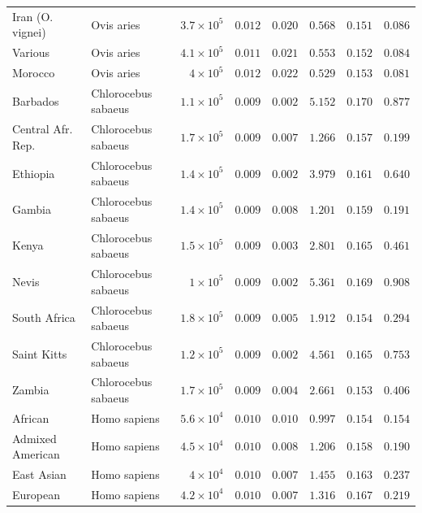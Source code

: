 \documentclass{article}
\begin{document}
\begin{center}
\begin{longtable*}{|l|l|r|r|r|r|r|r|}
            Iran (O. vignei) & Ovis aries & $3.7\times 10^{5}$ & $ 0.012$ & $ 0.020$ & $ 0.568$ & $ 0.151$ & $ 0.086$ \\
            Various & Ovis aries & $4.1\times 10^{5}$ & $ 0.011$ & $ 0.021$ & $ 0.553$ & $ 0.152$ & $ 0.084$ \\
            Morocco & Ovis aries & $ 4\times 10^{5}$ & $ 0.012$ & $ 0.022$ & $ 0.529$ & $ 0.153$ & $ 0.081$ \\
             Barbados & Chlorocebus sabaeus & $1.1\times 10^{5}$ & $ 0.009$ & $ 0.002$ & $ 5.152$ & $ 0.170$ & $ 0.877$ \\
             Central Afr. Rep. & Chlorocebus sabaeus & $1.7\times 10^{5}$ & $ 0.009$ & $ 0.007$ & $ 1.266$ & $ 0.157$ & $ 0.199$ \\
             Ethiopia & Chlorocebus sabaeus & $1.4\times 10^{5}$ & $ 0.009$ & $ 0.002$ & $ 3.979$ & $ 0.161$ & $ 0.640$ \\
             Gambia & Chlorocebus sabaeus & $1.4\times 10^{5}$ & $ 0.009$ & $ 0.008$ & $ 1.201$ & $ 0.159$ & $ 0.191$ \\
             Kenya & Chlorocebus sabaeus & $1.5\times 10^{5}$ & $ 0.009$ & $ 0.003$ & $ 2.801$ & $ 0.165$ & $ 0.461$ \\
             Nevis & Chlorocebus sabaeus & $ 1\times 10^{5}$ & $ 0.009$ & $ 0.002$ & $ 5.361$ & $ 0.169$ & $ 0.908$ \\
             South Africa & Chlorocebus sabaeus & $1.8\times 10^{5}$ & $ 0.009$ & $ 0.005$ & $ 1.912$ & $ 0.154$ & $ 0.294$ \\
             Saint Kitts & Chlorocebus sabaeus & $1.2\times 10^{5}$ & $ 0.009$ & $ 0.002$ & $ 4.561$ & $ 0.165$ & $ 0.753$ \\
             Zambia & Chlorocebus sabaeus & $1.7\times 10^{5}$ & $ 0.009$ & $ 0.004$ & $ 2.661$ & $ 0.153$ & $ 0.406$ \\
            African & Homo sapiens & $5.6\times 10^{4}$ & $ 0.010$ & $ 0.010$ & $ 0.997$ & $ 0.154$ & $ 0.154$ \\
            Admixed American & Homo sapiens & $4.5\times 10^{4}$ & $ 0.010$ & $ 0.008$ & $ 1.206$ & $ 0.158$ & $ 0.190$ \\
            East Asian & Homo sapiens & $ 4\times 10^{4}$ & $ 0.010$ & $ 0.007$ & $ 1.455$ & $ 0.163$ & $ 0.237$ \\
            European & Homo sapiens & $4.2\times 10^{4}$ & $ 0.010$ & $ 0.007$ & $ 1.316$ & $ 0.167$ & $ 0.219$ \\

\end{longtable*}
\end{center}
\end{document}
